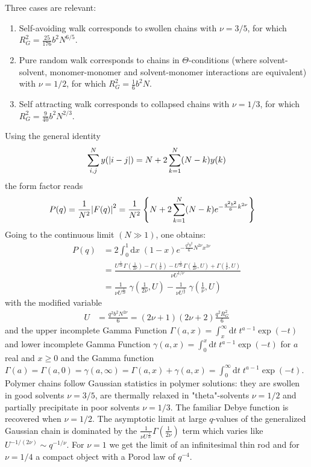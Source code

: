 Three cases are relevant:
\begin{enumerate}
\item Self-avoiding walk corresponds to swollen chains with $\nu = 3/5$, for which
$R_G^2=\frac{25}{176}b^2N^{6/5}$.
\item Pure random walk corresponds to chains in $\Theta$-conditions (where solvent-solvent,
monomer-monomer and solvent-monomer interactions are equivalent) with $\nu = 1/2$,
for which $R_G^2=\frac{1}{6}b^2N$.
\item Self attracting walk corresponds to collapsed chains with $\nu = 1/3$, for which
$R_G^2=\frac{9}{40}b^2N^{2/3}$.
\end{enumerate}
Using the general identity
\begin{align}
\sum_{i,j}^N y(\abs{i-j}) = N+2\sum_{k=1}^N(N-k) y(k)
\end{align}
the form factor reads
\begin{align}
P(q) &= \frac{1}{N^2}\abs{F(q)}^2 = \frac{1}{N^2}
\left\{N+2\sum_{k=1}^N(N-k)e^{-\frac{q^2b^2}{6}k^{2\nu}} \right\}
\end{align}
Going to the continuous limit $(N \gg 1)$, one obtains:
\begin{subequations}
\begin{align}
P(q) &= 2\int_0^1 \mathrm{d}x \; (1-x)e^{-\frac{q^2b^2}{6}N^{2\nu}x^{2\nu}} \\
&= \frac{U^{\frac{1}{2 \nu}} \Gamma\left(\frac{1}{2 \nu}\right)-
\Gamma\left(\frac{1}{\nu}\right)-U^{\frac{1}{2\nu}}
\Gamma\left(\frac{1}{2 \nu},U\right)+\Gamma\left(\frac{1}{\nu},U\right)}{\nu U^{1/\nu}} \\
&= \frac{1}{\nu U^{\frac{1}{2 \nu}}} \; \gamma\left(\frac{1}{2 \nu},U\right)-
   \frac{1}{\nu U^{\frac{1}{\nu}}}   \; \gamma\left(\frac{1}{  \nu},U\right)
\label{eq:generalizedGauss}
\end{align}
\end{subequations}
with the modified variable
\begin{align}
U&=\frac{q^2b^2N^{2\nu}}{6} = \left(2\nu+1\right)\left(2\nu+2\right)\frac{q^2R_G^2}{6}
\label{eq:Uexclvol}
\end{align}
and the upper incomplete Gamma Function $\Gamma(a,x) = \int_x^\infty \mathrm{d}t \; t^{a-1} \exp(-t)$ and lower incomplete Gamma Function $\gamma(a,x) = \int_0^x \mathrm{d}t \; t^{a-1} \exp(-t)$
for $a$ real and $x \geq 0$ and the Gamma function $\Gamma(a)=\Gamma(a,0)=\gamma(a,\infty)= \Gamma(a,x)+\gamma(a,x)=\int_0^\infty \mathrm{d}t\;  t^{a-1} \exp(-t)$.
Polymer chains follow Gaussian statistics in polymer solutions: they are swollen in good
solvents $\nu=3/5$, are thermally relaxed in "theta"-solvents $\nu=1/2$ and partially precipitate in poor solvents $\nu=1/3$.
The familiar Debye function is recovered when $\nu = 1/2$. The asymptotic limit at large $q$-values of the generalized
Gaussian chain is dominated by the $\frac{1}{\nu U^{\frac{1}{2\nu}}}\Gamma\left(\frac{1}{2\nu}\right)$
term which varies like $U^{-1/(2\nu)} \sim q^{-1/\nu}$. For $\nu =1$ we get the limit of an infinitesimal thin rod
and for $\nu=1/4$ a compact object with a Porod law of $q^{-4}$.


